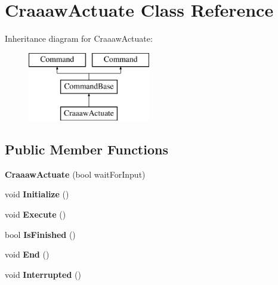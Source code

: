 \hypertarget{class_craaaw_actuate}{}\section{Craaaw\+Actuate Class Reference}
\label{class_craaaw_actuate}
Inheritance diagram for Craaaw\+Actuate\+:\begin{figure}[H]
\begin{center}
\leavevmode
\includegraphics[height=3.000000cm]{class_craaaw_actuate}
\end{center}
\end{figure}
\subsection*{Public Member Functions}
\begin{DoxyCompactItemize}
\item 
\hypertarget{class_craaaw_actuate_a85d88e3f43f5d21138d78f9cf6aff479}{}{\bfseries Craaaw\+Actuate} (bool wait\+For\+Input)\label{class_craaaw_actuate_a85d88e3f43f5d21138d78f9cf6aff479}

\item 
\hypertarget{class_craaaw_actuate_aba3e1ec2c8eaa70e15d46477fa2225aa}{}void {\bfseries Initialize} ()\label{class_craaaw_actuate_aba3e1ec2c8eaa70e15d46477fa2225aa}

\item 
\hypertarget{class_craaaw_actuate_a42f8b323a22505255d68a89b1bf2fe76}{}void {\bfseries Execute} ()\label{class_craaaw_actuate_a42f8b323a22505255d68a89b1bf2fe76}

\item 
\hypertarget{class_craaaw_actuate_ad80a466af7f6f9a2d3a9d8c27cc85abb}{}bool {\bfseries Is\+Finished} ()\label{class_craaaw_actuate_ad80a466af7f6f9a2d3a9d8c27cc85abb}

\item 
\hypertarget{class_craaaw_actuate_a952ab82f0967b018693ca668ff515492}{}void {\bfseries End} ()\label{class_craaaw_actuate_a952ab82f0967b018693ca668ff515492}

\item 
\hypertarget{class_craaaw_actuate_a6f024ab216b31a00919e918a02adbf03}{}void {\bfseries Interrupted} ()\label{class_craaaw_actuate_a6f024ab216b31a00919e918a02adbf03}

\end{DoxyCompactItemize}
